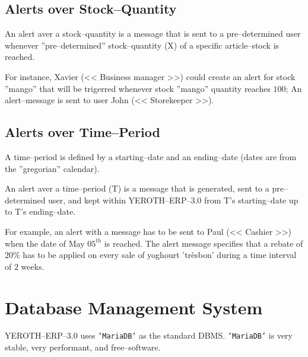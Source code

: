 \documentclass[a4paper, 10pt]{article}
\newcommand{\yerotherpblack}{YEROTH--ERP--$3.0$\xspace}
\newcommand{\manager}{<< Business manager >>\xspace}
\newcommand{\storekeeper}{<< Storekeeper >>\xspace}
\newcommand{\cashier}{<< Cashier >>\xspace}
\newcommand{\mariadb}{\texttt{'MariaDB'}\xspace}
\begin{document}
\begin{multicols}{2}
\subsection{Alerts over Stock--Quantity}

An alert aver a stock--quantity is a message that
is sent to a pre--determined user whenever
''pre--determined'' stock--quantity (X) of
a specific article--stock is reached.

For instance, Xavier (\manager) could create
an alert for stock ''mango'' that will be
trigerred whenever stock ''mango'' quantity
reaches $100$; An alert--message is sent
to user John (\storekeeper).

\subsection{Alerts over Time--Period}

A time--period is defined by a
starting--date and an ending--date
(dates are from the ''gregorian'' calendar).

An alert aver a time--period (T) is a message
that is generated, sent to a pre--determined user,
and kept within \yerotherpblack from T's starting--date 
up to T's ending--date.

For example, an alert with a message has to be
sent to Paul (\cashier) when the date of May
$05^{th}$ is reached. The alert message
specifies that a rebate of $20\%$ has to be applied
on every sale of yoghourt 'tr\`esbon' during a
time interval of $2$ weeks.

\section{Database Management System}
\vspace{-0.3em}
\yerotherpblack uses \mariadb as the standard DBMS. 
\mariadb is very stable, very performant,
and free--software.

\vspace{-0.3em}


\end{multicols}
\end{document}
